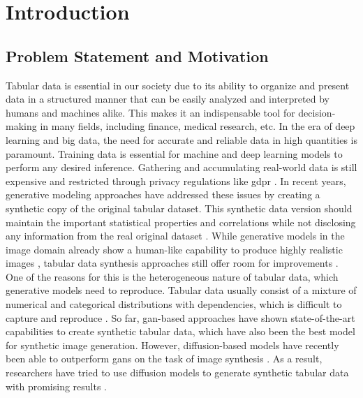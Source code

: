 \chapter{Introduction}
\label{ch:introduction}

\section{Problem Statement and Motivation}
\label{ch:intro-problemStatement}

Tabular data is essential in our society due to its ability to organize and present data in a structured manner
that can be easily analyzed and interpreted by humans and machines alike.
This makes it an indispensable tool for decision-making in many fields, including finance, medical research, etc.
In the era of deep learning and big data, the need for accurate and reliable data in high quantities is paramount.
Training data is essential for machine and deep learning \glspl{model} to perform any desired inference.
Gathering and accumulating real-world data is still expensive \cite{borisov2022DeepNeuralNetworks} and restricted through privacy regulations like \gls{gdpr}  \cite{european_commission_regulation_2016}.
In recent years, generative modeling approaches have addressed these issues by creating a synthetic copy of the original tabular dataset.
This synthetic data version should maintain the important statistical properties and correlations while not disclosing any information from the real original dataset \cite{goodfellow2020GenerativeAdversarialNetworks, mottini2018AirlinePassengerName}.
While generative models in the image domain already show a human-like capability to produce highly realistic images \cite{dhariwal2021DiffusionModelsBeat},
tabular data synthesis approaches still offer room for improvements \cite{chundawat2022UniversalMetricRobust}.
One of the reasons for this is the heterogeneous nature of tabular data, which generative models need to reproduce.
Tabular data usually consist of a mixture of numerical and categorical distributions with dependencies, which is difficult to capture and reproduce \cite{borisov2022DeepNeuralNetworks}.
So far, \gls{gan}-based approaches have shown state-of-the-art capabilities to create synthetic tabular data, which have also been the best model for synthetic image generation.
However, diffusion-based models have recently been able to outperform \glspl{gan} on the task of image synthesis \cite{dhariwal2021DiffusionModelsBeat}.
As a result, researchers have tried to use diffusion models to generate synthetic tabular data with promising results \cite{kotelnikov2022TabDDPMModellingTabular, zheng2022DiffusionModelsMissing}.

